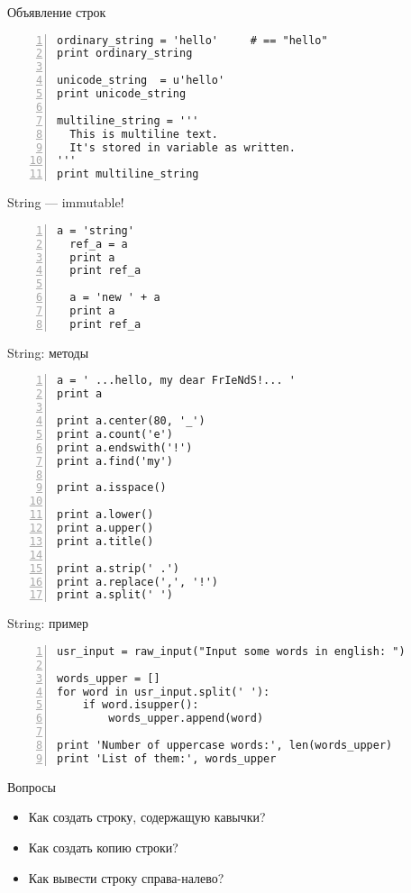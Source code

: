 \documentclass[hyperref={pdftex,unicode}]{beamer}
\begin{document}
\begin{frame}[fragile]{Объявление строк}
\begin{lstlisting}[basicstyle=\footnotesize\ttfamily,numbers=left]
ordinary_string = 'hello'     # == "hello"
print ordinary_string

unicode_string  = u'hello'
print unicode_string

multiline_string = '''
  This is multiline text.
  It's stored in variable as written.
'''
print multiline_string
\end{lstlisting}
\end{frame}

\begin{frame}[fragile]{String --- immutable!}
\begin{lstlisting}[basicstyle=\footnotesize\ttfamily,numbers=left]
  a = 'string'
  ref_a = a
  print a
  print ref_a

  a = 'new ' + a
  print a
  print ref_a

\end{lstlisting}
\end{frame}

\begin{frame}[fragile]{String: методы}
\begin{lstlisting}[basicstyle=\footnotesize\ttfamily,numbers=left]
a = ' ...hello, my dear FrIeNdS!... '
print a

print a.center(80, '_')
print a.count('e')
print a.endswith('!')
print a.find('my')

print a.isspace()

print a.lower()
print a.upper()
print a.title()

print a.strip(' .')
print a.replace(',', '!')
print a.split(' ')
\end{lstlisting}
\end{frame}

\begin{frame}[fragile]{String: пример}
\begin{lstlisting}[basicstyle=\footnotesize\ttfamily,numbers=left]
usr_input = raw_input("Input some words in english: ")

words_upper = []
for word in usr_input.split(' '):
    if word.isupper():
        words_upper.append(word)

print 'Number of uppercase words:', len(words_upper)
print 'List of them:', words_upper
\end{lstlisting}
\end{frame}

\begin{frame}{Вопросы}
  \begin{itemize}
  \item Как создать строку, содержащую кавычки?
  \item Как создать копию строки?
  \item Как вывести строку справа-налево?
  \end{itemize}
\end{frame}
\end{document}
